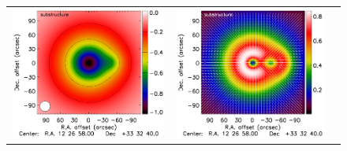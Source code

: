 \documentclass[traditabstract]{aa}
\begin{document}
\begin{figure}[h]
{\begin{tabular}{lll}
\includegraphics[trim=0cm 0.7cm 0cm 0cm, clip=true, scale=1]{Figure/Map_toy_substructure.pdf} &
\includegraphics[trim=2.3cm 0.7cm 0cm 0cm, clip=true, scale=1]{Figure/Grad_substructure_15_15_45.pdf} &

\end{tabular}}
\end{figure}
\end{document}
